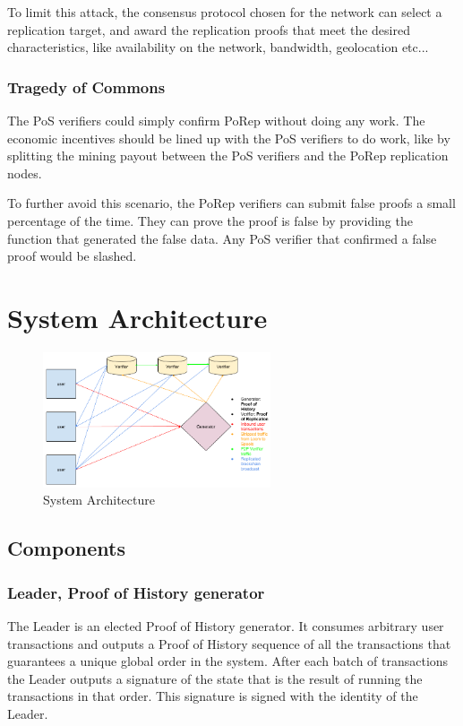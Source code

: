 \documentclass[12pt]{ltjsarticle}
\begin{document}
To limit this attack, the consensus protocol chosen for the network can select a replication target, and award the replication proofs that meet the desired characteristics, like availability on the network, bandwidth, geolocation etc...
\subsubsection{Tragedy of Commons}

The PoS verifiers could simply confirm PoRep without doing any work. The economic incentives should be lined up with the PoS verifiers to do work, like by splitting the mining payout between the PoS verifiers and the PoRep replication nodes.

To further avoid this scenario, the PoRep verifiers can submit false proofs a small percentage of the time. They can prove the proof is false by providing the function that generated the false data. Any PoS verifier that confirmed a false proof would be slashed.

\section{System Architecture}\label{system_architecture}

\begin{figure}
  \begin{center}
    \centering
    \includegraphics[width=0.6\textwidth]{../../figures/fig_9.png}
    \caption[Fig 9]{System Architecture \label{fig_9}}
  \end{center}
  \end{figure}

\subsection{Components}

\subsubsection{Leader, Proof of History generator}
The Leader is an elected Proof of History generator. It consumes arbitrary user transactions and outputs a Proof of History sequence of all the transactions that guarantees a unique global order in the system. After each batch of transactions the Leader outputs a signature of the state that is the result of running the transactions in that order. This signature is signed with the identity of the Leader.
\end{document}
